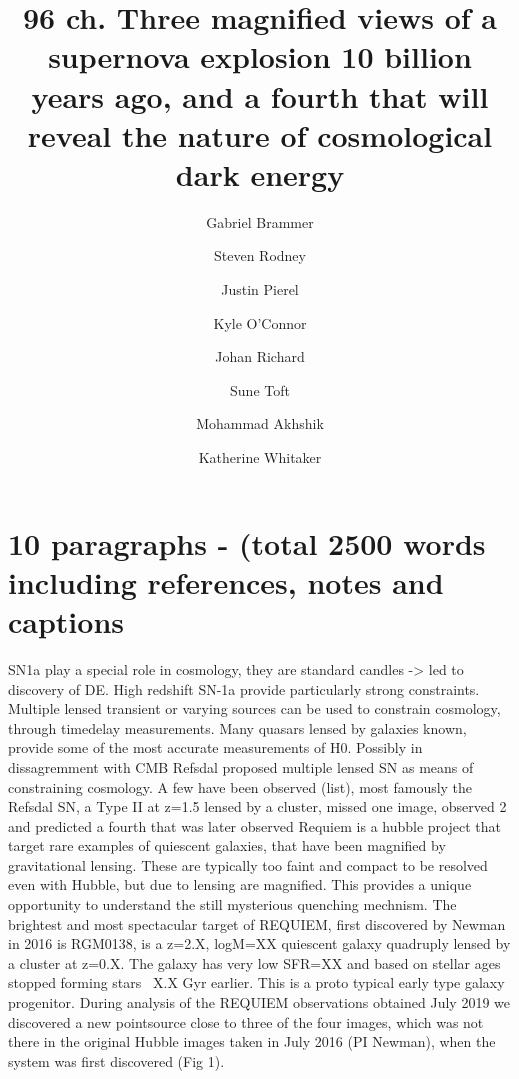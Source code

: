 \documentclass[fleqn,10pt]{wlscirep}
\title{96 ch. Three magnified views of a supernova explosion 10 billion years ago, and a fourth that will reveal the nature of cosmological dark energy}
\author[1,*]{Gabriel Brammer}
\author[2]{Steven Rodney}
\author[2]{Justin Pierel}
\author[2]{Kyle O'Connor}
\author[3]{Johan Richard}
\author[1]{Sune Toft}
\author[4]{Mohammad Akhshik}
\author[5]{Katherine Whitaker}
\affil[1]{Cosmic Dawn Center, Niels Bohr Institute, K{\o}benhavns Universitet}
\affil[2]{University of South Carolina}
\affil[3]{Universit\'e Claude Bernard Lyon}
\affil[4]{University of Connecticut}
\affil[5]{University of Massachusetts, Amherst}
\affil[*]{gabriel.brammer@nbi.ku.dk}
\begin{document}
\flushbottom
\maketitle

%
%


\section*{10 paragraphs - (total 2500 words including references, notes and captions}
SN1a play a special role in cosmology, they are standard candles -> led to discovery of DE. High redshift SN-1a provide particularly strong constraints.
\newline
\newline
Multiple lensed transient or varying sources can be used to constrain cosmology, through timedelay measurements.  Many quasars lensed by galaxies known, provide some of the most accurate measurements of H0.  Possibly in dissagremment with CMB 
\newline
\newline
Refsdal proposed multiple lensed SN as means of constraining cosmology. A few have been observed (list), most famously the Refsdal SN, a Type II at z=1.5 lensed by a cluster, missed one image, observed 2 and predicted a fourth that was later observed
\newline
\newline
Requiem is a hubble project that target rare examples of quiescent galaxies, that have been magnified by gravitational lensing. These are typically too faint and compact to be resolved even with Hubble, but due to lensing are magnified. This provides a unique opportunity to  understand the still mysterious quenching mechnism. 
The brightest and most spectacular target of REQUIEM, first discovered by Newman in 2016 is RGM0138, is a z=2.X, logM=XX quiescent galaxy quadruply lensed by a cluster at z=0.X. The galaxy has very low SFR=XX and based on stellar ages stopped forming stars ~X.X Gyr earlier. This is a proto typical early type galaxy progenitor.
\newline
\newline
During analysis of the REQUIEM observations obtained  July 2019 we discovered a new pointsource close to three of the four images, which was not there in the original Hubble images taken in July 2016 (PI Newman), when the system was first discovered (Fig 1). 
\newline
\newline
\end{document}
